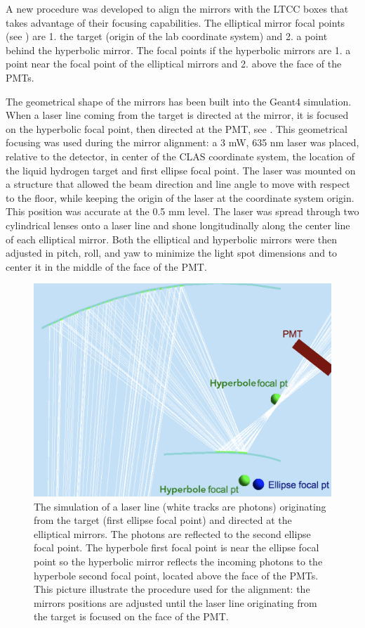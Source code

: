 A new procedure was developed to align the mirrors with the LTCC boxes that takes advantage of their focusing capabilities.
The elliptical mirror focal points (see ) are 1. the target (origin of the lab coordinate system)
and 2. a point behind the hyperbolic mirror. The focal points if the hyperbolic mirrors are 1. a point near the focal point of the elliptical mirrors and
2. above the face of the PMTs.

The geometrical shape of the mirrors has been built into the Geant4 simulation. When a laser line coming from the target is directed at the mirror,
it is focused on the hyperbolic focal point, then directed at the PMT, see .
This geometrical focusing was used during the mirror alignment: a 3 mW, 635 nm laser was placed, relative to the detector,
in center of the CLAS coordinate system, the location of the liquid hydrogen target and first ellipse focal point.
The laser was mounted on a structure that allowed the beam direction and line angle to move with respect to the floor, while keeping
the origin of the laser at the coordinate system origin.
This position was accurate at the 0.5 mm level. The laser was spread through two cylindrical lenses onto a laser line and shone
longitudinally along the center line of each elliptical mirror. Both the elliptical and hyperbolic mirrors were then adjusted in pitch, roll, and yaw to minimize the light spot
dimensions and to center it in the middle of the face of the PMT.


\begin{figure}[ht]
\centering
	\includegraphics[width=0.95\columnwidth, keepaspectratio]{img/mirrorAlignmentSimulationZoomed.png}
	\caption{The simulation of a laser line (white tracks are photons) originating from the target (first ellipse focal point) and directed at the elliptical mirrors. The photons are reflected
		      to the second ellipse focal point. The hyperbole first focal point is near the ellipse focal point so the hyperbolic mirror
			   reflects the incoming photons to the hyperbole second focal point, located above the face of the PMTs.
			   This picture illustrate the procedure used for the alignment: the mirrors positions are adjusted until the laser line originating from the target is focused on the face of the PMT.}
	\label{fig:alignmentSimulation}
\end{figure}


